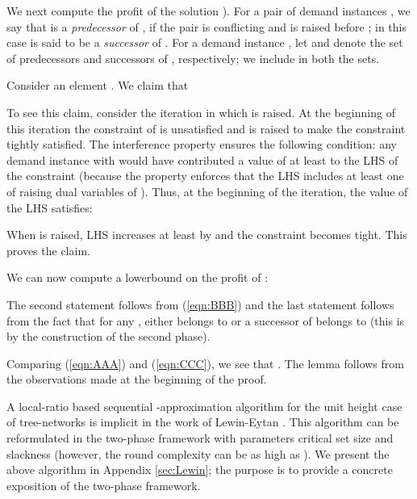 \documentclass[11pt]{article}
\newcommand{\qed} {\hfill}
\begin{document}
We next compute the profit of the solution ).
For a pair of demand instances , we say that  is a {\em predecessor} of ,
if the pair is conflicting and  is raised before ; in this case  is said to be a {\em successor} of .
For a demand instance , let  and  denote the set of predecessors and successors of ,
respectively; we include  in both the sets.

Consider an element . We claim that 

To see this claim, consider the iteration in which  is raised.
At the beginning of this iteration the constraint of  is unsatisfied 
and  is raised to make the constraint tightly satisfied.
The interference property ensures the following condition:
any demand instance  with  would have contributed a value of at least 
to the LHS of the constraint (because the property enforces that the LHS includes at least one of raising dual variables
of ). Thus, at the beginning of the iteration, the value of the LHS satisfies:

When  is raised, LHS increases at least by  and the constraint becomes tight.
This proves the claim.

We can now compute a lowerbound on the profit of :

The second statement follows from (\ref{eqn:BBB}) and 
the last statement follows from the fact that for any , either  belongs to 
or a successor of  belongs to  (this is by the construction of the second phase).

Comparing (\ref{eqn:AAA}) and (\ref{eqn:CCC}), we see that .
The lemma follows from the observations made at the beginning of the proof.
\qed

A local-ratio based sequential -approximation algorithm for the unit height case of tree-networks
is implicit in the work of Lewin-Eytan \cite{Lewin-Eytan}.
This algorithm can be reformulated in the two-phase framework with parameters 
critical set size  and slackness  (however, the round complexity can be as high as ).
We present the above algorithm in Appendix \ref{sec:Lewin};
the purpose is to provide a concrete exposition of the two-phase framework.
\end{document}
